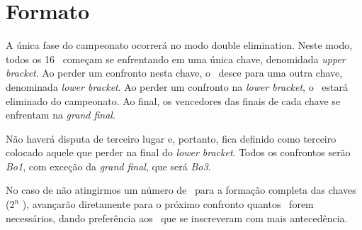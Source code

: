 \section{Formato}

A única fase do campeonato ocorrerá no modo double elimination. Neste modo, todos os 16 \BasicUnitPl\ começam se enfrentando em uma única chave, denomidada \textit{upper bracket}. Ao perder um confronto nesta chave, o \BasicUnit\ desce para uma outra chave, denominada \textit{lower bracket}. Ao perder um confronto na \textit{lower bracket}, o \BasicUnit\ estará eliminado do campeonato. Ao final, os vencedores das finais de cada chave se enfrentam na \textit{grand final}.

Não haverá disputa de terceiro lugar e, portanto, fica definido como terceiro colocado aquele que perder na final do \textit{lower bracket}. Todos os confrontos serão \textit{Bo1}, com exceção da \textit{grand final}, que será \textit{Bo3}.

No caso de não atingirmos um número de \BasicUnitPl\ para a formação completa das chaves (\(2^n\) \BasicUnitPl), avançarão diretamente para o próximo confronto quantos \BasicUnitPl\ forem necessários, dando preferência aos \BasicUnitPl\ que se inscreveram com mais antecedência.